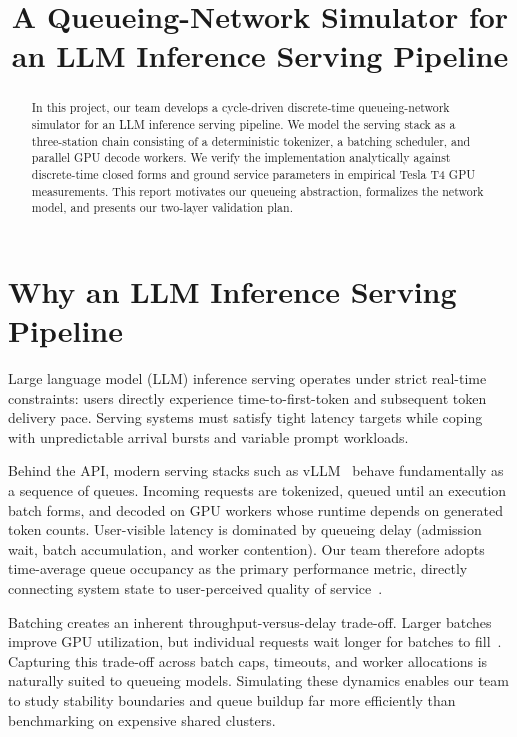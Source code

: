 \documentclass[conference]{IEEEtran}
\title{A Queueing-Network Simulator for an LLM Inference Serving Pipeline}
\author{\IEEEauthorblockN{Vaibhav Mahore (23631), [Name (SR No.)], [Name (SR No.)]}\IEEEauthorblockA{UG BTech (M\&C), Department of Computer Science and Automation\\
Indian Institute of Science, Bangalore}}
\begin{document}
\maketitle

\begin{abstract}
In this project, our team develops a cycle-driven discrete-time queueing-network simulator for an LLM inference serving pipeline. We model the serving stack as a three-station chain consisting of a deterministic tokenizer, a batching scheduler, and parallel GPU decode workers. We verify the implementation analytically against discrete-time closed forms and ground service parameters in empirical Tesla T4 GPU measurements. This report motivates our queueing abstraction, formalizes the network model, and presents our two-layer validation plan.
\end{abstract}

\section{Why an LLM Inference Serving Pipeline}
Large language model (LLM) inference serving operates under strict real-time constraints: users directly experience time-to-first-token and subsequent token delivery pace. Serving systems must satisfy tight latency targets while coping with unpredictable arrival bursts and variable prompt workloads.

Behind the API, modern serving stacks such as vLLM~\cite{kwon2023vllm} behave fundamentally as a sequence of queues. Incoming requests are tokenized, queued until an execution batch forms, and decoded on GPU workers whose runtime depends on generated token counts. User-visible latency is dominated by queueing delay (admission wait, batch accumulation, and worker contention). Our team therefore adopts time-average queue occupancy as the primary performance metric, directly connecting system state to user-perceived quality of service~\cite{zheng2023response}.

Batching creates an inherent throughput-versus-delay trade-off. Larger batches improve GPU utilization, but individual requests wait longer for batches to fill~\cite{yu2022orca}. Capturing this trade-off across batch caps, timeouts, and worker allocations is naturally suited to queueing models. Simulating these dynamics enables our team to study stability boundaries and queue buildup far more efficiently than benchmarking on expensive shared clusters.
\end{document}
